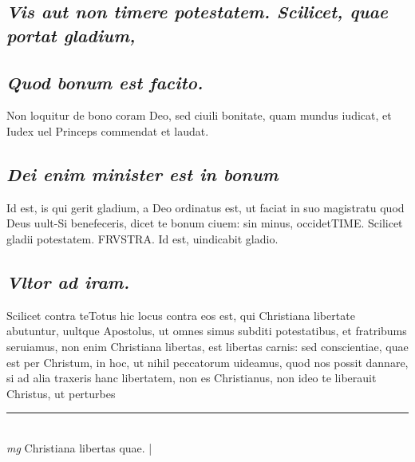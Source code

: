 \documentclass{article}
\begin{document}
\begin{pages}
\subsection*{\textit{Vis aut non timere potestatem. Scilicet, quae portat gladium, }}
{}
\subsection*{\textit{Quod bonum est facito. }}\pstart Non loquitur de bono coram Deo, sed ciuili bonitate, quam mundus iudicat, et Iudex uel Princeps commendat et laudat.  \pend
{}
{}
\subsection*{\textit{Dei enim minister est in bonum }}\pstart Id est, is qui gerit gladium, a Deo ordinatus est, ut faciat in suo magistratu quod Deus uult-Si benefeceris, dicet te bonum ciuem: sin minus, occidetTIME. Scilicet gladii potestatem. FRVSTRA.  Id est, uindicabit gladio.  \pend
{}
{}
\subsection*{\textit{Vltor ad iram. }}\pstart Scilicet contra teTotus hic locus contra eos est, qui Christiana libertate abutuntur, uultque Apostolus, ut omnes simus subditi potestatibus, et fratribums seruiamus, non enim Christiana libertas, est libertas carnis: sed conscientiae, quae est per Christum, in hoc, ut nihil peccatorum uideamus, quod nos possit dannare, si ad alia traxeris hanc libertatem, non es Christianus, non ideo te liberauit Christus, ut perturbes  \pend
\vspace{0.5cm}\noindent
\vspace{0.2cm}\rule{1cm}{0.2pt}\\ 
\hspace{0.2cm}\textit{mg}
\footnotesize Christiana libertas quae.  
\normalsize| 
\endnumbering
\end{pages}
\end{document}
